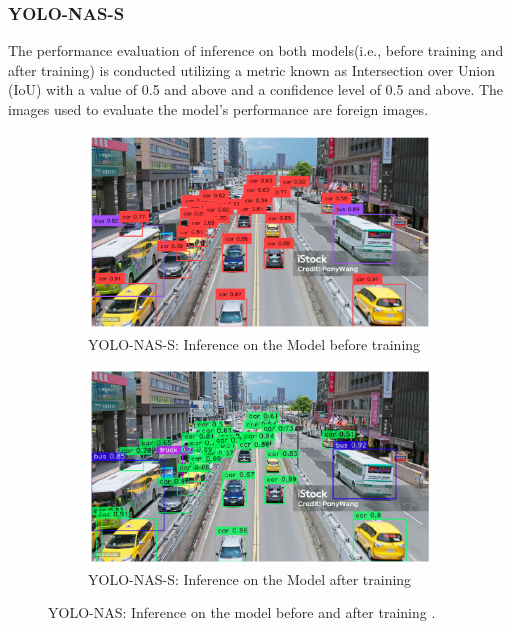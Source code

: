 \subsubsection{YOLO-NAS-S}
The performance evaluation of inference on both models(i.e., before training and after training) is conducted utilizing a metric known as Intersection over Union (IoU) with a value of 0.5 and above and a confidence level of 0.5 and above. The images used to evaluate the model's performance are foreign images.
\begin{figure}[H]
  \centering
  \begin{subfigure}{\textwidth}
    \centering
    \includegraphics[width=\textwidth]{tex/img/YNS2_BT_3.png}
    \caption{YOLO-NAS-S: Inference on the Model before training}
    \label{fig:sub_s1}
  \end{subfigure}
  \hfill
  \begin{subfigure}{\textwidth}
    \centering
    \includegraphics[width=\textwidth]{tex/img/YNS2_AT_3.png}
    \caption{YOLO-NAS-S: Inference on the Model after training}
    \label{fig:sub_s2}
  \end{subfigure}
  \caption{YOLO-NAS: Inference on the model before and  after training .}
  \label{fig:NAS-S} 
\end{figure}

